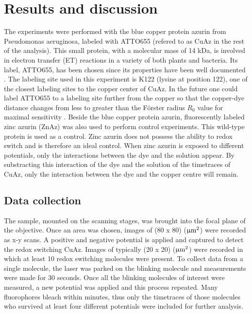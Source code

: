 \documentclass[twoside,single]{lion-msc}
\begin{document}
\chapter{Results and discussion}

The experiments were performed with the blue copper protein azurin from Pseudomonas aeruginosa, labeled with ATTO655 (refered to as CuAz in the rest of the analysis). This small protein, with a molecular mass of 14 kDa, is involved in electron transfer (ET) reactions in a variety of both plants and bacteria. Its label, ATTO655, has been chosen since its properties have been well documented \cite{pvd_11}. The labeling site used in this experiment is K122 (lysine at position 122), one of the closest labeling sites to the copper center of CuAz. In the future one could label ATTO655 to a labeling site further from the copper so that the copper-dye distance changes from less to greater than the F\"{o}rster radius $R_{0}$ value for maximal sensitivity \cite{Roy2008}. 
Beside the blue copper protein azurin, fluorescently labeled zinc azurin (ZnAz) was also used to perform control experiments. This wild-type protein is used as a control. Zinc azurin does not possess the ability to redox switch and is therefore an ideal control. When zinc azurin is exposed to different potentials, only the interactions between the dye and the solution appear. By substracting this interaction of the dye and the solution of the timetraces of CuAz, only the interaction between the dye and the copper centre will remain. 

\section*{Data collection} \label{data_coll}
The sample, mounted on the scanning stages, was brought into the focal plane of the objective. Once an area was chosen, images of (80 x 80) ($\upmu \textup{m}^{2}$) were recorded as x-y scans. A positive and negative potential is applied and captured to detect the redox switching CuAz. Images of typically (20 x 20) ($\upmu \textup{m}^{2}$) were recorded in which at least 10 redox switching molecules were present. To collect data from a single molecule, the laser was parked on the blinking molecule and measurements were made for 30 seconds. Once all the blinking molecules of interest were measured, a new potential was applied and this process repeated. Many fluorophores bleach within minutes, thus only the timetraces of those molecules who survived at least four different potentials were included for further analysis. 
\end{document}
